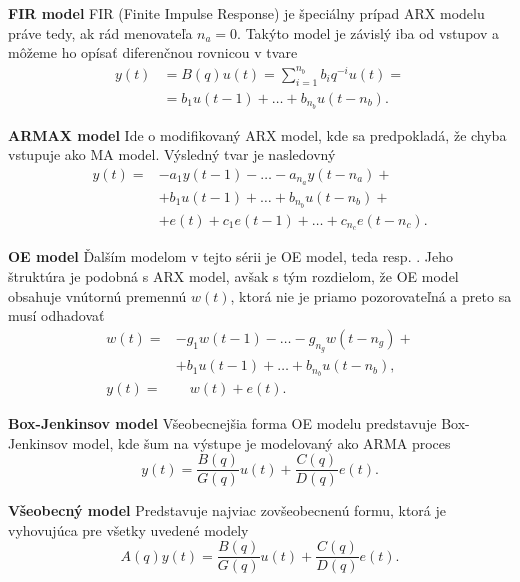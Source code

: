  \textbf{FIR model}
 \newline
 FIR (Finite Impulse Response) je špeciálny prípad ARX modelu práve tedy, ak rád menovateľa $n_a = 0$. Takýto model je závislý iba od vstupov a môžeme ho opísať diferenčnou rovnicou v tvare
 \begin{equation}
 	\begin{split}
 		y(t) &= B(q)u(t) = \sum_{i=1}^{n_b} b_{i}q^{-i}u(t) = \\
 			 &= b_{1}u(t-1) + \dots + b_{n_b}u(t-n_b).
 	\end{split}
 	\label{eq:FIR_m}
 \end{equation}
 
 \textbf{ARMAX model}
 \newline
 Ide o modifikovaný ARX model, kde sa predpokladá, že chyba vstupuje ako MA model. Výsledný tvar je nasledovný 
 \begin{equation}
	 \begin{split}
		 y(t) = &- a_{1}y(t-1) - \dots - a_{n_a}y(t-n_a) + \\
		 		&+ b_{1}u(t-1) + \dots + b_{n_b}u(t-n_b) + \\
		 		&+ e(t) + c_{1}e(t-1) + \dots + c_{n_c}e(t-n_c).
	 \end{split} 
 \end{equation}
 
 \textbf{OE model}
 \newline
 Ďalším modelom v tejto sérii je OE model, teda  resp. . Jeho štruktúra je podobná s ARX model, avšak s tým rozdielom, že OE model obsahuje vnútornú premennú $w(t)$, ktorá nie je priamo pozorovateľná a preto sa musí odhadovať
 \begin{equation}
	 \begin{split}
		 w(t) = &- g_{1}w(t-1) - \dots - g_{n_g}w(t-n_g) + \\
		 		&+ b_{1}u(t-1) + \dots + b_{n_b}u(t-n_b), \\
		 y(t) = &\quad w(t) + e(t).
	 \end{split} 
 \end{equation}
 
 \textbf{Box-Jenkinsov model}
 \newline
 Všeobecnejšia forma OE modelu predstavuje Box-Jenkinsov model, kde šum na výstupe je modelovaný ako ARMA proces
 \begin{equation}
 	y(t) = \frac{B(q)}{G(q)}u(t) + \frac{C(q)}{D(q)}e(t).
 \end{equation}
 
\textbf{Všeobecný model}
\newline 
Predstavuje najviac zovšeobecnenú formu, ktorá je vyhovujúca pre všetky uvedené modely
\begin{equation}
	A(q)y(t) = \frac{B(q)}{G(q)}u(t) + \frac{C(q)}{D(q)}e(t).
\end{equation}
